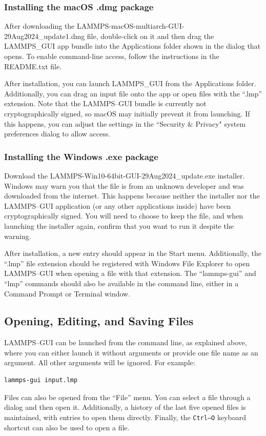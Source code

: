 \documentclass[9pt,tutorial]{livecoms}
\begin{document}
\begin{appendices}
\subsubsection{Installing the macOS .dmg package}

After downloading the LAMMPS-macOS-multiarch-GUI-29Aug2024\_update1.dmg file,
double-click on it and then drag the LAMMPS\_GUI app bundle
into the Applications folder shown in the dialog that opens.  To
enable command-line access, follow the instructions in the README.txt
file.

After installation, you can launch LAMMPS\_GUI from the Applications
folder.  Additionally, you can drag an input file onto the app or open files with the
``.lmp'' extension.  Note that the LAMMPS--GUI bundle is currently not
cryptographically signed, so macOS may initially prevent it from launching.
If this happens, you can adjust the settings in the ``Security \& Privacy" system
preferences dialog to allow access.

\subsubsection{Installing the Windows .exe package}

Download the LAMMPS-Win10-64bit-GUI-29Aug2024\_update.exe installer.
Windows may warn you that the file is from an unknown developer
and was downloaded from the internet.  This happens because neither the
installer nor the LAMMPS--GUI application (or any other applications inside)
have been cryptographically signed.  You will need to choose to keep the file,
and when launching the installer again, confirm that you want to run it despite the warning.

After installation, a new entry should appear in the Start menu.  Additionally,
the ``.lmp'' file extension should be registered with  Windows File
Explorer to open LAMMPS--GUI when opening a file with that
extension.  The ``lammps-gui'' and ``lmp'' commands should also be available
in the command line, either in a Command Prompt or Terminal window.

\subsection{Opening, Editing, and Saving Files}

LAMMPS--GUI can be launched from the command line, as explained above, where you
can either launch it without arguments or provide one file name as an argument.  All
other arguments will be ignored.  For example:
\begin{lstlisting}
lammps-gui input.lmp
\end{lstlisting}
Files can also be opened from the ``File'' menu.  You can select a
file through a dialog and then open it.  Additionally, a history of
the last five opened files is maintained, with entries to open them directly.
Finally, the \texttt{Ctrl--O} keyboard shortcut can also be used to open a file.


\end{appendices}
\end{document}
